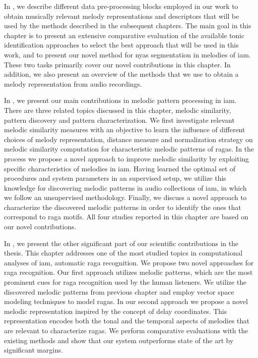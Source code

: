 In , we describe different data pre-processing blocks employed in our work to obtain musically relevant melody representations and descriptors that will be used by the methods described in the subsequent chapters. The main goal in this chapter is to present an extensive comparative evaluation of the available tonic identification approaches to select the best approach that will be used in this work, and to present our novel method for \gls{nyas} segmentation in melodies of \gls{iam}. These two tasks primarily cover our novel contributions in this chapter. In addition, we also present an overview of the methods that we use to obtain a melody representation from audio recordings.

In , we present our main contributions in melodic pattern processing in \gls{iam}. There are three related topics discussed in this chapter, melodic similarity, pattern discovery and pattern characterization. We first investigate relevant melodic similarity measures with an objective to learn the influence of different choices of melody representation, distance measure and normalization strategy on melodic similarity computation for characteristic melodic patterns of \glspl{raga}. In the process we propose a novel approach to improve melodic similarity by exploiting specific characteristics of melodies in \gls{iam}. Having learned the optimal set of procedures and system parameters in an supervised setup, we utilize this knowledge for discovering melodic patterns in audio collections of \gls{iam}, in which we follow an unsupervised methodology. Finally, we discuss a novel approach to characterize the discovered melodic patterns in order to identify the ones that correspond to \gls{raga} motifs. All four studies reported in this chapter are based on our novel contributions.

In , we present the other significant part of our scientific contributions in the thesis. This chapter addresses one of the most studied topics in computational analyses of \gls{iam}, automatic \gls{raga} recognition. We propose two novel approaches for \gls{raga} recognition. Our first approach utilizes melodic patterns, which are the most prominent cues for \gls{raga} recognition used by the human listeners. We utilize the discovered melodic patterns from previous chapter and employ vector space modeling techniques to model \glspl{raga}. In our second approach we propose a novel melodic representation inspired by the concept of delay coordinates. This representation encodes both the tonal and the temporal aspects of melodies that are relevant to characterize \glspl{raga}. We perform comparative evaluations with the existing methods and show that our system outperforms state of the art by significant margins.

